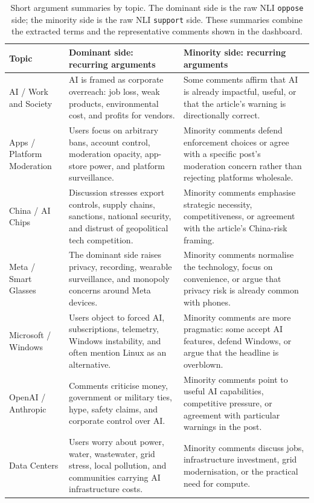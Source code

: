 \documentclass[11pt,a4paper]{article}
\begin{document}
\begin{table}[H]
\centering
\footnotesize
\caption{Short argument summaries by topic. The dominant side is the raw NLI \texttt{oppose} side;
the minority side is the raw NLI \texttt{support} side. These summaries combine the extracted terms
and the representative comments shown in the dashboard.}
\label{tab:argument-summary}
\renewcommand{\arraystretch}{1.18}
\begin{tabularx}{\linewidth}{p{3.0cm} X X}
\toprule
\textbf{Topic} & \textbf{Dominant side: recurring arguments} & \textbf{Minority side: recurring arguments} \\
\midrule
AI / Work and Society & AI is framed as corporate overreach: job loss, weak products, environmental cost, and profits for vendors. & Some comments affirm that AI is already impactful, useful, or that the article's warning is directionally correct. \\
Apps / Platform Moderation & Users focus on arbitrary bans, account control, moderation opacity, app-store power, and platform surveillance. & Minority comments defend enforcement choices or agree with a specific post's moderation concern rather than rejecting platforms wholesale. \\
China / AI Chips & Discussion stresses export controls, supply chains, sanctions, national security, and distrust of geopolitical tech competition. & Minority comments emphasise strategic necessity, competitiveness, or agreement with the article's China-risk framing. \\
Meta / Smart Glasses & The dominant side raises privacy, recording, wearable surveillance, and monopoly concerns around Meta devices. & Minority comments normalise the technology, focus on convenience, or argue that privacy risk is already common with phones. \\
Microsoft / Windows & Users object to forced AI, subscriptions, telemetry, Windows instability, and often mention Linux as an alternative. & Minority comments are more pragmatic: some accept AI features, defend Windows, or argue that the headline is overblown. \\
OpenAI / Anthropic & Comments criticise money, government or military ties, hype, safety claims, and corporate control over AI. & Minority comments point to useful AI capabilities, competitive pressure, or agreement with particular warnings in the post. \\
Data Centers & Users worry about power, water, wastewater, grid stress, local pollution, and communities carrying AI infrastructure costs. & Minority comments discuss jobs, infrastructure investment, grid modernisation, or the practical need for compute. \\

\end{tabularx}
\end{table}
\end{document}
